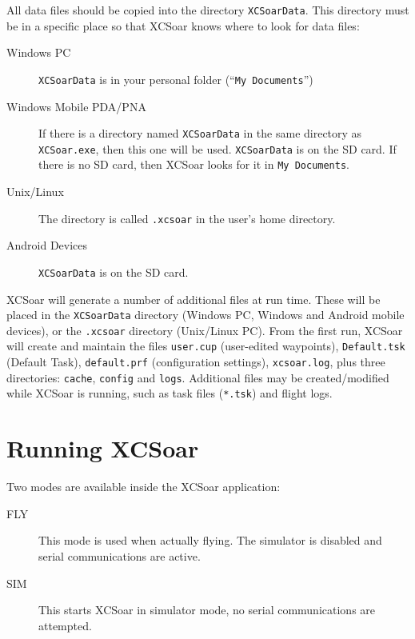 All data files should be copied into the directory
\texttt{XCSoarData}.  This directory must be in a specific place
so that XCSoar knows where to look for data files:

\begin{description}
\item[Windows PC]
\texttt{XCSoarData} is in your personal folder (``\texttt{My
Documents}'')
\item[Windows Mobile PDA/PNA]
If there is a directory named \texttt{XCSoarData} in the same
directory as \texttt{XCSoar.exe}, then this one will be used.
\texttt{XCSoarData} is on the SD card.  If there is no SD card, then
XCSoar looks for it in \texttt{My Documents}.
\item[Unix/Linux]
The directory is called \verb|.xcsoar| in the user's home directory.
\item[Android Devices]
\texttt{XCSoarData} is on the SD card.
\end{description}


XCSoar will generate a number of additional files at run time.  These
will be placed in the  \texttt{XCSoarData} directory (Windows PC, 
Windows and Android mobile devices), or the \texttt{.xcsoar} directory (Unix/Linux
PC).  From the first run, XCSoar will create and maintain the files
\texttt{user.cup} (user-edited waypoints),
\texttt{Default.tsk} (Default Task),  
\texttt{default.prf} 
(configuration settings),
\texttt{xcsoar.log}, 
plus three directories: \texttt{cache},
\texttt{config} and \texttt{logs}.  Additional files may be
created/modified while XCSoar is running, such as task files
(\texttt{*.tsk}) and flight logs.


\section{Running XCSoar}

Two modes are available inside the XCSoar application: 
\begin{description}
\item[FLY] This mode is used when actually flying.  The simulator is 
  disabled and serial communications are active. 
\item[SIM] This starts XCSoar in simulator mode, no serial communications
  are attempted.
\end{description}

